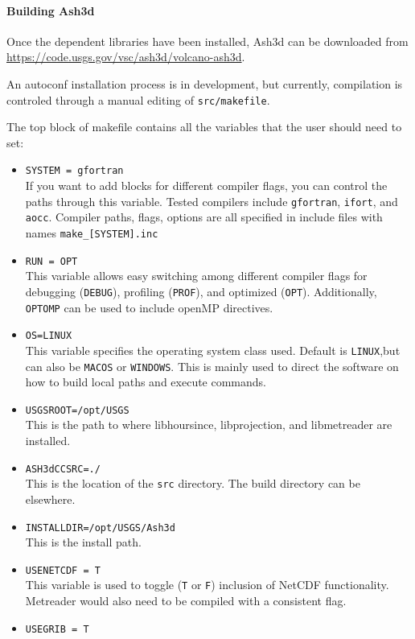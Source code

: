 \paragraph{Building Ash3d}
Once the dependent libraries have been installed, Ash3d can be downloaded from
\url{https://code.usgs.gov/vsc/ash3d/volcano-ash3d}.

An autoconf installation process is in development, but currently,
compilation is controled through a manual editing of 
\texttt{src/makefile}.

The top block of makefile contains all the variables that the user should
need to set:
\begin{itemize}
 \item \texttt{SYSTEM = gfortran}\\
If you want to add blocks for different compiler flags, you can control
the paths through this variable.  Tested compilers include \texttt{gfortran},
\texttt{ifort}, and \texttt{aocc}. Compiler paths, flags, options are all
specified in include files with names \texttt{make\_[SYSTEM].inc}
 \item \texttt{RUN = OPT}\\
This variable allows easy switching among different compiler flags for debugging
(\texttt{DEBUG}),
profiling (\texttt{PROF}), and optimized (\texttt{OPT}).  Additionally, \texttt{OPTOMP}
can be used to include openMP directives.
 \item \texttt{OS=LINUX}\\
This variable specifies the operating system class used.  Default is \texttt{LINUX},but
can also be \texttt{MACOS} or \texttt{WINDOWS}. This is mainly used to direct the
software on how to build local paths and execute commands.
 \item \texttt{USGSROOT=/opt/USGS}\\
This is the path to where libhoursince, libprojection, and libmetreader are installed.
 \item \texttt{ASH3dCCSRC=./}\\
This is the location of the \texttt{src} directory.  The build directory can be
elsewhere.
 \item \texttt{INSTALLDIR=/opt/USGS/Ash3d}\\
This is the install path.
 \item \texttt{USENETCDF = T}\\
This variable is used to toggle (\texttt{T} or \texttt{F}) inclusion of NetCDF
functionality.  Metreader would also need to be compiled with a consistent flag.
 \item \texttt{USEGRIB   = T}\\

\end{itemize}

